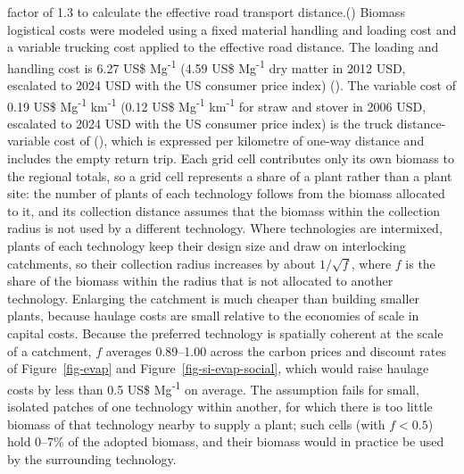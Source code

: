 \documentclass[
  letterpaper,
]{article}
\begin{document}
factor of 1.3 to calculate the effective road transport
distance.() Biomass logistical
costs were modeled using a fixed material handling and loading cost and
a variable trucking cost applied to the effective road distance. The
loading and handling cost is 6.27 US\$ Mg\textsuperscript{-1} (4.59 US\$
Mg\textsuperscript{-1} dry matter in 2012 USD, escalated to 2024 USD
with the US consumer price index) ().
The variable cost of 0.19 US\$ Mg\textsuperscript{-1}
km\textsuperscript{-1} (0.12 US\$ Mg\textsuperscript{-1}
km\textsuperscript{-1} for straw and stover in 2006 USD, escalated to
2024 USD with the US consumer price index) is the truck
distance-variable cost of (), which
is expressed per kilometre of one-way distance and includes the empty
return trip. Each grid cell contributes only its own biomass to the
regional totals, so a grid cell represents a share of a plant rather
than a plant site: the number of plants of each technology follows from
the biomass allocated to it, and its collection distance assumes that
the biomass within the collection radius is not used by a different
technology. Where technologies are intermixed, plants of each technology
keep their design size and draw on interlocking catchments, so their
collection radius increases by about \(1/\sqrt{f}\), where \(f\) is the
share of the biomass within the radius that is not allocated to another
technology. Enlarging the catchment is much cheaper than building
smaller plants, because haulage costs are small relative to the
economies of scale in capital costs. Because the preferred technology is
spatially coherent at the scale of a catchment, \(f\) averages
0.89--1.00 across the carbon prices and discount rates of
Figure~\ref{fig-evap} and Figure~\ref{fig-si-evap-social}, which would
raise haulage costs by less than 0.5 US\$ Mg\textsuperscript{-1} on
average. The assumption fails for small, isolated patches of one
technology within another, for which there is too little biomass of that
technology nearby to supply a plant; such cells (with \(f < 0.5\)) hold
0--7\% of the adopted biomass, and their biomass would in practice be
used by the surrounding technology.
\end{document}
